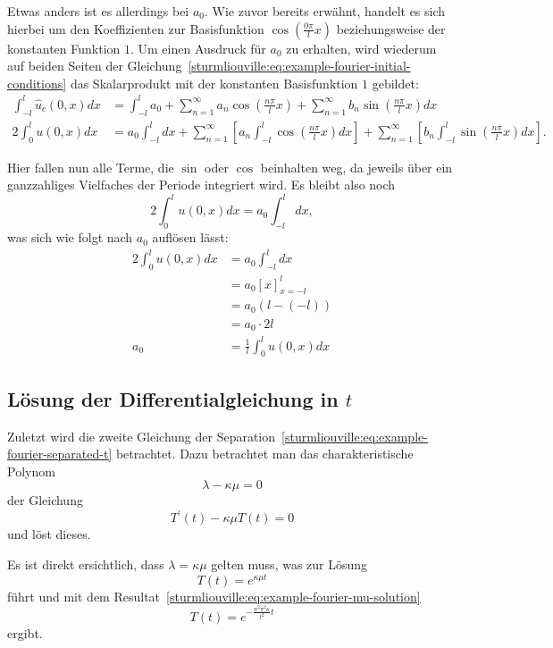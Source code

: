Etwas anders ist es allerdings bei $a_0$.
Wie zuvor bereits erwähnt, handelt es sich hierbei um den Koeffizienten
zur Basisfunktion $\cos\left(\frac{0 \pi}{l}x\right)$ beziehungsweise der
konstanten Funktion $1$.
Um einen Ausdruck für $a_0$ zu erhalten, wird wiederum auf beiden Seiten
der Gleichung~\eqref{sturmliouville:eq:example-fourier-initial-conditions} das
Skalarprodukt mit der konstanten Basisfunktion $1$ gebildet:
\[
\begin{aligned}
    \int_{-l}^{l}\hat{u}_c(0, x)dx
    &=
    \int_{-l}^{l} a_0
    +
    \sum_{n = 1}^{\infty} a_n\cos\left(\frac{n\pi}{l}x\right)
    +
    \sum_{n = 1}^{\infty} b_n\sin\left(\frac{n\pi}{l}x\right)dx
    \\
    2\int_{0}^{l}u(0, x)dx
    &=
    a_0 \int_{-l}^{l}dx
    +
    \sum_{n = 1}^{\infty}\left[a_n\int_{-l}^{l}\cos\left(\frac{n\pi}{l}x\right)
        dx\right] +
    \sum_{n = 1}^{\infty}\left[b_n\int_{-l}^{l}\sin\left(\frac{n\pi}{l}x\right)
        dx\right].
\end{aligned}
\]

Hier fallen nun alle Terme, die $\sin$ oder $\cos$ beinhalten weg, da jeweils
über ein ganzzahliges Vielfaches der Periode integriert wird.
Es bleibt also noch
\[
    2\int_{0}^{l}u(0, x)dx
    =
    a_0 \int_{-l}^{l}dx,
\]
was sich wie folgt nach $a_0$ auflösen lässt:
\[
\begin{aligned}
    2\int_{0}^{l}u(0, x)dx
    &=
    a_0 \int_{-l}^{l}dx
    \\
    &=
    a_0 \left[x\right]_{x=-l}^{l}
    \\
    &=
    a_0(l - (-l))
    \\
    &=
    a_0 \cdot 2l
    \\
    a_0
    &=
    \frac{1}{l} \int_{0}^{l}u(0, x)dx
\end{aligned}
\]

%
%

\subsection{Lösung der Differentialgleichung in $t$}
Zuletzt wird die zweite Gleichung der 
Separation~\eqref{sturmliouville:eq:example-fourier-separated-t} betrachtet.
Dazu betrachtet man das charakteristische Polynom
\[
    \lambda - \kappa \mu
    =
    0
\]
der Gleichung
\[
    T^{\prime}(t) - \kappa \mu T(t)
    =
    0
\]
und löst dieses.

Es ist direkt ersichtlich, dass $\lambda = \kappa \mu$ gelten muss, was zur
Lösung
\[
    T(t)
    =
    e^{\kappa \mu t}
\]
führt und mit dem Resultat~\eqref{sturmliouville:eq:example-fourier-mu-solution}
\[
    T(t)
    =
    e^{-\frac{n^{2}\pi^{2}\kappa}{l^{2}}t}
\]
ergibt.

